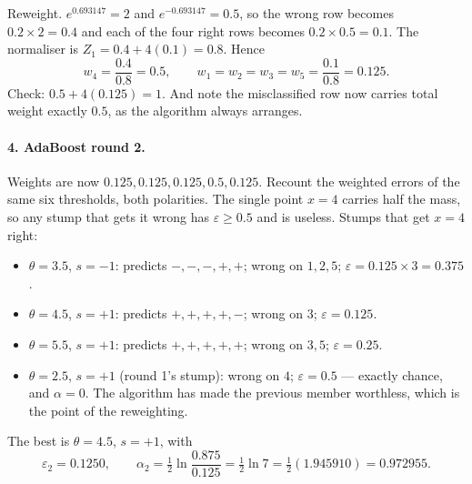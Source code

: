 \documentclass[11pt]{article}
\begin{document}
Reweight. $e^{0.693147} = 2$ and $e^{-0.693147} = 0.5$, so the wrong row
becomes $0.2 \times 2 = 0.4$ and each of the four right rows becomes
$0.2 \times 0.5 = 0.1$. The normaliser is $Z_1 = 0.4 + 4(0.1) = 0.8$. Hence
\[
  w_4 = \frac{0.4}{0.8} = \mathbf{0.5},
  \qquad
  w_1 = w_2 = w_3 = w_5 = \frac{0.1}{0.8} = \mathbf{0.125}.
\]
Check: $0.5 + 4(0.125) = 1$. And note the misclassified row now carries total
weight exactly $0.5$, as the algorithm always arranges.

\paragraph{4. AdaBoost round 2.}
Weights are now $0.125, 0.125, 0.125, 0.5, 0.125$. Recount the weighted errors
of the same six thresholds, both polarities. The single point $x = 4$ carries
half the mass, so any stump that gets it wrong has $\varepsilon \geq 0.5$ and
is useless. Stumps that get $x = 4$ right:
\begin{itemize}
  \item $\theta = 3.5$, $s = -1$: predicts $-,-,-,+,+$; wrong on $1, 2, 5$;
    $\varepsilon = 0.125 \times 3 = 0.375$.
  \item $\theta = 4.5$, $s = +1$: predicts $+,+,+,+,-$; wrong on $3$;
    $\varepsilon = 0.125$.
  \item $\theta = 5.5$, $s = +1$: predicts $+,+,+,+,+$; wrong on $3, 5$;
    $\varepsilon = 0.25$.
  \item $\theta = 2.5$, $s = +1$ (round 1's stump): wrong on $4$;
    $\varepsilon = 0.5$ --- exactly chance, and $\alpha = 0$. The algorithm has
    made the previous member worthless, which is the point of the reweighting.
\end{itemize}
The best is $\theta = 4.5$, $s = +1$, with
\[
  \varepsilon_2 = \mathbf{0.1250},
  \qquad
  \alpha_2 = \tfrac12\ln\frac{0.875}{0.125} = \tfrac12\ln 7
           = \tfrac12(1.945910) = \mathbf{0.972955}.
\]
\end{document}
